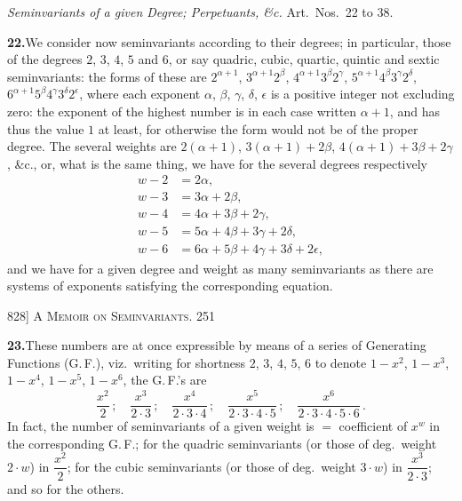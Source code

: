 \documentclass[11pt]{article}
\begin{document}
\medskip
\begin{center}
\textit{Seminvariants of a given Degree; Perpetuants, \&c.} \quad Art.\ Nos.\ 22 to 38.
\end{center}

\medskip
\noindent\textbf{22.}\quad We consider now seminvariants according to their degrees;
in particular, those of the degrees $2$, $3$, $4$, $5$ and $6$, or say quadric, cubic,
quartic, quintic and sextic seminvariants: the forms of these are $2^{\alpha+1}$,
$3^{\alpha+1}2^{\beta}$, $4^{\alpha+1}3^{\beta}2^{\gamma}$, $5^{\alpha+1}4^{\beta}3^{\gamma}2^{\delta}$,
$6^{\alpha+1}5^{\beta}4^{\gamma}3^{\delta}2^{\epsilon}$, where each exponent $\alpha$, $\beta$,
$\gamma$, $\delta$, $\epsilon$ is a positive integer not excluding zero: the exponent
of the highest number is in each case written $\alpha+1$, and has thus the value $1$
at least, for otherwise the form would not be of the proper degree. The several
weights are $2(\alpha+1)$, $3(\alpha+1)+2\beta$, $4(\alpha+1)+3\beta+2\gamma$, \&c., or,
what is the same thing, we have for the several degrees respectively
\[
\begin{aligned}
w-2 &= 2\alpha,\\
w-3 &= 3\alpha+2\beta,\\
w-4 &= 4\alpha+3\beta+2\gamma,\\
w-5 &= 5\alpha+4\beta+3\gamma+2\delta,\\
w-6 &= 6\alpha+5\beta+4\gamma+3\delta+2\epsilon,
\end{aligned}
\]
and we have for a given degree and weight as many seminvariants as there are systems
of exponents satisfying the corresponding equation.

\newpage
\noindent\textsc{828] \hfill A Memoir on Seminvariants. \hfill 251}
\vspace{0.6em}

\medskip
\noindent\textbf{23.}\quad These numbers are at once expressible by means of a series
of Generating Functions (G.\,F.), viz.\ writing for shortness $2$, $3$, $4$, $5$, $6$
to denote $1-x^{2}$, $1-x^{3}$, $1-x^{4}$, $1-x^{5}$, $1-x^{6}$, the G.\,F.'s are
\[
\frac{x^{2}}{2}\,;\quad \frac{x^{3}}{2\cdot 3}\,;\quad \frac{x^{4}}{2\cdot 3\cdot 4}\,;\quad
\frac{x^{5}}{2\cdot 3\cdot 4\cdot 5}\,;\quad \frac{x^{6}}{2\cdot 3\cdot 4\cdot 5\cdot 6}\,.
\]
In fact, the number of seminvariants of a given weight is $=$ coefficient of $x^{w}$
in the corresponding G.\,F.; for the quadric seminvariants (or those of deg.\ weight
$2\cdot w$) in $\dfrac{x^{2}}{2}$; for the cubic seminvariants (or those of deg.\ weight
$3\cdot w$) in $\dfrac{x^{3}}{2\cdot 3}$; and so for the others.
\end{document}
